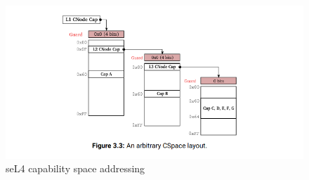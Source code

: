 \begin{figure}
    \centering
    \includegraphics[scale=0.5]{./figures/seL4_cap_space_addresssing.png}
    \caption{seL4 capability space addressing}
    \label{fig:sel4_cap_space_addressing}
\end{figure}

